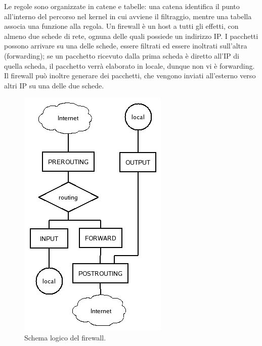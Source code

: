 Le regole sono organizzate in catene e tabelle: una catena identifica il punto all'interno del percorso nel kernel in cui avviene il filtraggio, mentre una tabella associa una funzione alla regola. Un firewall è un host a tutti gli effetti, con almeno due schede di rete, ognuna delle quali possiede un indirizzo IP. I pacchetti possono arrivare su una delle schede, essere filtrati ed essere inoltrati sull'altra (forwarding); se un pacchetto ricevuto dalla prima scheda è diretto all'IP di quella scheda, il pacchetto verrà elaborato in locale, dunque non vi è forwarding. Il firewall può inoltre generare dei pacchetti, che vengono inviati all'esterno verso altri IP su una delle due schede.
\begin{figure}[htbp]
	\centering
%		
	\includegraphics[scale = 0.4]{images/firewall-logic-scheme}
	\caption{Schema logico del firewall.}
	\label{img:schema-logico-firewall}
\end{figure}\\
